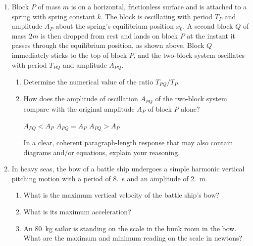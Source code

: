 \documentclass{../../../oss-classkick}
\begin{document}
\begin{enumerate}
\item %
  Block $P$ of mass $m$ is on a horizontal, frictionless surface and is
  attached to a spring with spring constant $k$. The block is oscillating with
  period $T_P$ and amplitude $A_P$ about the spring's equilibrium position
  $x_0$. A second block $Q$ of mass $2m$ is then dropped from rest and lands on
  block $P$ at the instant it passes through the equilibrium position, as shown
  above. Block $Q$ immediately sticks to the top of block $P$, and the
  two-block system oscillates with period $T_{PQ}$ and amplitude $A_{PQ}$.
  \begin{enumerate}
  \item Determine the numerical value of the ratio $T_{PQ}/T_P$.
  \item How does the amplitude of oscillation $A_{PQ}$ of the two-block system
    compare with the original amplitude $A_P$ of block $P$ alone?

    \vspace{.1in}
    \underline{\hspace{.3in}} $A_{PQ}<A_{P}$\hspace{.25in}
    \underline{\hspace{.3in}} $A_{PQ}=A_{P}$\hspace{.25in}
    \underline{\hspace{.3in}} $A_{PQ}>A_{P}$

    \vspace{.2in}In a clear, coherent paragraph-length response that may also
    contain diagrams and/or equations, explain your reasoning.
  \end{enumerate}
  \newpage
  
\item In heavy seas, the bow of a battle ship undergoes a simple harmonic
  vertical pitching motion with a period of \SI{8.}{\second} and an amplitude
  of \SI{2.}{\metre}.
  \begin{enumerate}
  \item What is the maximum vertical velocity of the battle ship's bow?
  \item What is its maximum acceleration?
  \item An \SI{80}{\kilo\gram} sailor is standing on the scale in the bunk room
    in the bow. What are the maximum and minimum reading on the scale in
    newtons?
  \end{enumerate}
  \newpage
  

\end{enumerate}
\end{document}
